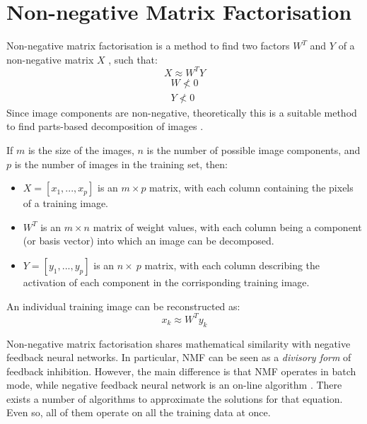 \documentclass[11pt,a4paper]{report}
\begin{document}
		\section{Non-negative Matrix Factorisation}
			Non-negative matrix factorisation is a method to find two factors $W^T$ and $Y$ of a non-negative matrix $X$  \cite{spratling2009unsupervised}, such that:
			\begin{equation}
				X \approx W^T Y
			\end{equation}
			\begin{equation}
				\begin{split}
					W \nless 0 \\
					Y \nless 0
				\end{split}
			\end{equation}
			Since image components are non-negative, theoretically this is a suitable method to find parts-based decomposition of images \cite{feng2002local}. 
			
			If $m$ is the size of the images, $n$ is the number of possible image components, and $p$ is the number of images in the training set, then:
			\begin{itemize}
				\item $X = [x_1, ..., x_p]$ is an $m \times p$ matrix, with each column containing the pixels of a training image.
				\item $W^T$ is an $m \times n$ matrix of weight values, with each column being a component (or basis vector) into which an image can be decomposed.
				\item $Y = [y_1, ..., y_p]$ is an $n \times\ p$ matrix, with each column describing the activation of each component in the corrisponding training image.
			\end{itemize}
			An individual training image can be reconstructed as:
			\begin{equation}
				x_k \approx W^T y_k
			\end{equation}

			Non-negative matrix factorisation shares mathematical similarity with negative feedback neural networks. In particular, NMF can be seen as a \emph{divisory form} of feedback inhibition. However, the main difference is that NMF operates in batch mode, while negative feedback neural network is an on-line algorithm \cite{spratling2009unsupervised}. There exists a number of algorithms to approximate the solutions for that equation. Even so, all of them operate on all the training data at once.
			
\end{document}
